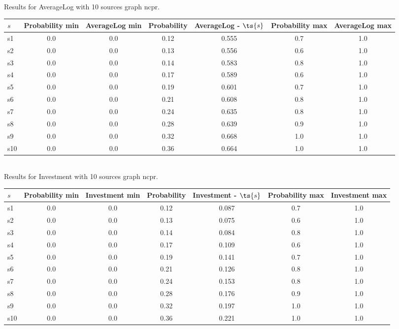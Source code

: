 \documentclass{article}
\begin{document}
\noindent Results for AverageLog with 10 sources graph ncpr.

\noindent\begin{tabular}{|l|c|c|c|c|c|c|}
\hline
$s$& Probability min & AverageLog min & Probability & AverageLog - $\ts{s}$ & Probability max & AverageLog max\\
\hline
s1 &0.0 & 0.0 & 0.12 & 0.555 & 0.7 & 1.0\\
\hline
s2 &0.0 & 0.0 & 0.13 & 0.556 & 0.6 & 1.0\\
\hline
s3 &0.0 & 0.0 & 0.14 & 0.583 & 0.8 & 1.0\\
\hline
s4 &0.0 & 0.0 & 0.17 & 0.589 & 0.6 & 1.0\\
\hline
s5 &0.0 & 0.0 & 0.19 & 0.601 & 0.7 & 1.0\\
\hline
s6 &0.0 & 0.0 & 0.21 & 0.608 & 0.8 & 1.0\\
\hline
s7 &0.0 & 0.0 & 0.24 & 0.635 & 0.8 & 1.0\\
\hline
s8 &0.0 & 0.0 & 0.28 & 0.639 & 0.9 & 1.0\\
\hline
s9 &0.0 & 0.0 & 0.32 & 0.668 & 1.0 & 1.0\\
\hline
s10 &0.0 & 0.0 & 0.36 & 0.664 & 1.0 & 1.0\\
\hline
\end{tabular}\\

\noindent Results for Investment with 10 sources graph ncpr.

\noindent\begin{tabular}{|l|c|c|c|c|c|c|}
\hline
$s$& Probability min & Investment min & Probability & Investment - $\ts{s}$ & Probability max & Investment max\\
\hline
s1 &0.0 & 0.0 & 0.12 & 0.087 & 0.7 & 1.0\\
\hline
s2 &0.0 & 0.0 & 0.13 & 0.075 & 0.6 & 1.0\\
\hline
s3 &0.0 & 0.0 & 0.14 & 0.084 & 0.8 & 1.0\\
\hline
s4 &0.0 & 0.0 & 0.17 & 0.109 & 0.6 & 1.0\\
\hline
s5 &0.0 & 0.0 & 0.19 & 0.141 & 0.7 & 1.0\\
\hline
s6 &0.0 & 0.0 & 0.21 & 0.126 & 0.8 & 1.0\\
\hline
s7 &0.0 & 0.0 & 0.24 & 0.153 & 0.8 & 1.0\\
\hline
s8 &0.0 & 0.0 & 0.28 & 0.176 & 0.9 & 1.0\\
\hline
s9 &0.0 & 0.0 & 0.32 & 0.197 & 1.0 & 1.0\\
\hline
s10 &0.0 & 0.0 & 0.36 & 0.221 & 1.0 & 1.0\\
\hline
\end{tabular}\\
\end{document}
